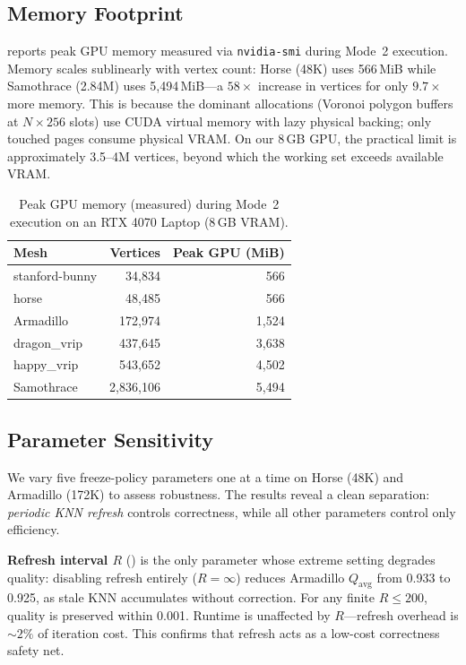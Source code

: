 \subsection{Memory Footprint}
\label{sec:memory}

 reports peak GPU memory measured via \texttt{nvidia-smi} during Mode~2 execution. Memory scales sublinearly with vertex count: Horse (48K) uses 566\,MiB while Samothrace (2.84M) uses 5,494\,MiB---a $58\times$ increase in vertices for only $9.7\times$ more memory. This is because the dominant allocations (Voronoi polygon buffers at $N \times 256$ slots) use CUDA virtual memory with lazy physical backing; only touched pages consume physical VRAM. On our 8\,GB GPU, the practical limit is approximately 3.5--4M vertices, beyond which the working set exceeds available VRAM.

\begin{table}[t]
\centering
\caption{Peak GPU memory (measured) during Mode~2 execution on an RTX 4070 Laptop (8\,GB VRAM).}
\label{tab:memory}
\small
\begin{tabular}{lrr}
\hline
Mesh & Vertices & Peak GPU (MiB) \\
\hline
stanford-bunny & 34{,}834 & 566 \\
horse & 48{,}485 & 566 \\
Armadillo & 172{,}974 & 1{,}524 \\
dragon\_vrip & 437{,}645 & 3{,}638 \\
happy\_vrip & 543{,}652 & 4{,}502 \\
Samothrace & 2{,}836{,}106 & 5{,}494 \\
\hline
\end{tabular}
\end{table}

\subsection{Parameter Sensitivity}
\label{sec:sensitivity}

We vary five freeze-policy parameters one at a time on Horse (48K) and Armadillo (172K) to assess robustness. The results reveal a clean separation: \emph{periodic KNN refresh} controls correctness, while all other parameters control only efficiency.

\textbf{Refresh interval $R$} () is the only parameter whose extreme setting degrades quality: disabling refresh entirely ($R = \infty$) reduces Armadillo $Q_{\mathrm{avg}}$ from 0.933 to 0.925, as stale KNN accumulates without correction. For any finite $R \leq 200$, quality is preserved within 0.001. Runtime is unaffected by $R$---refresh overhead is ${\sim}2\%$ of iteration cost. This confirms that refresh acts as a low-cost correctness safety net.

